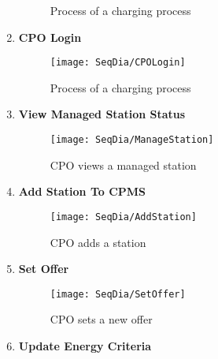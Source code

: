 \begin{enumerate}
\begin{figure}[H]
\begin{center}
            \caption{Process of a charging process}
            \label{fig:StartCharge}
            \end{center}
        \end{figure}
        \newpage
        \item \textbf{CPO Login}
        \begin{figure}[H]
            \begin{center}
            \texttt{[image: SeqDia/CPOLogin]}
            \caption{Process of a charging process}
            \label{fig:CPOLogin}
            \end{center}
        \end{figure}
        \item \textbf{View Managed Station Status}
        \begin{figure}[H]
            \begin{center}
            \texttt{[image: SeqDia/ManageStation]}
            \caption{CPO views a managed station}
            \label{fig:ManageStation}
            \end{center}
        \end{figure}
        \newpage
        \item \textbf{Add Station To CPMS}
        \begin{figure}[H]
            \begin{center}
            \texttt{[image: SeqDia/AddStation]}
            \caption{CPO adds a station}
            \label{fig:AddStation}
            \end{center}
        \end{figure}
        \newpage
        \item \textbf{Set Offer}
        \begin{figure}[H]
            \begin{center}
            \texttt{[image: SeqDia/SetOffer]}
            \caption{CPO sets a new offer}
            \label{fig:SetOffer}
            \end{center}
        \end{figure}
        \newpage
        \item \textbf{Update Energy Criteria}

\end{enumerate}
